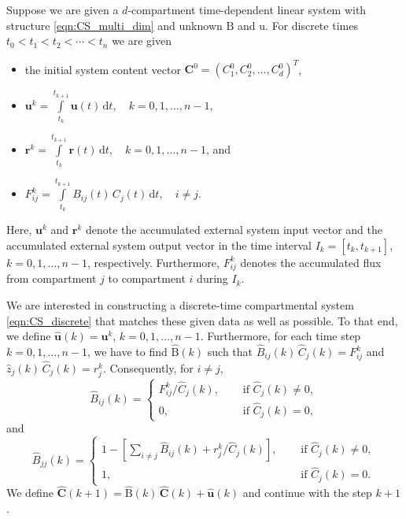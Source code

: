 \documentclass[11pt,a4paper]{article}
\renewcommand{\vec}[1]{\mathbf{#1}}
\newcommand{\tens}[1]{\mathrm{#1}}
\newcommand{\dd}[1]{\,\mathrm{d}#1}
\newcommand{\intl}{\int\limits}
\newcommand{\suml}{\sum\limits}
\begin{document}
    Suppose we are given a $d$-compartment time-dependent linear system with structure \eqref{eqn:CS_multi_dim} and unknown $\tens{B}$ and $\tens{u}$.
    For discrete times $t_0<t_1<t_2<\cdots<t_n$ we are given
    \begin{itemize}
        \item the initial system content vector $\vec{C}^0=(C^0_1,C^0_2,\ldots,C^0_d)^T$,
        \item $\vec{u}^k = \intl_{t_k}^{t_{k+1}} \vec{u}(t)\dd{t},\quad k=0,1,\ldots,n-1$, 
        \item $\vec{r}^k = \intl_{t_k}^{t_{k+1}} \vec{r}(t)\dd{t},\quad k=0,1,\ldots,n-1$, and
        \item $F_{ij}^k = \intl_{t_k}^{t_{k+1}} B_{ij}(t)\,C_j(t)\dd{t},\quad i\neq j$.
    \end{itemize}
    Here, $\vec{u}^k$ and $\vec{r}^k$ denote the accumulated external system input vector and the accumulated external system output vector in the time interval $I_k=[t_k,t_{k+1}]$, $k=0,1,\ldots,n-1$, respectively.
    Furthermore, $F^k_{ij}$ denotes the accumulated flux from compartment $j$ to compartment $i$ during $I_k$.

    We are interested in constructing a discrete-time compartmental system \eqref{eqn:CS_discrete} that matches these given data as well as possible.
    To that end, we define $\widehat{\vec{u}}(k)=\vec{u}^k$, $k=0,1,\ldots,n-1$.
    Furthermore, for each time step $k=0,1,\ldots,n-1$, we have to find $\widehat{\tens{B}}(k)$ such that $\widehat{B}_{ij}(k)\,\widehat{C}_j(k)=F^k_{ij}$ and $\widehat{z}_j(k)\,\widehat{C}_j(k)=r^k_j$.
    Consequently, for $i\neq j$,
    \begin{equation*}
        \widehat{B}_{ij}(k) =
        \begin{cases}
            F^k_{ij} / \widehat{C}_j(k),\quad&\text{ if }\widehat{C}_j(k)\neq0,\\
            0, &\text{ if }\widehat{C}_j(k)=0,
        \end{cases}
    \end{equation*}
    and
    \begin{equation*}
        \widehat{B}_{jj}(k) = 
        \begin{cases}
            1-\left[\suml_{i\neq j}\widehat{B}_{ij}(k)+r^k_j/\widehat{C}_j(k)\right],\quad &\text{ if }\widehat{C}_j(k)\neq0,\\
            1, &\text{ if }\widehat{C}_j(k)=0.
        \end{cases}
    \end{equation*}
    We define $\widehat{\vec{C}}(k+1)=\widehat{\tens{B}}(k)\,\widehat{\vec{C}}(k)+\widehat{\vec{u}}(k)$ and continue with the step $k+1$.
    
\end{document}
